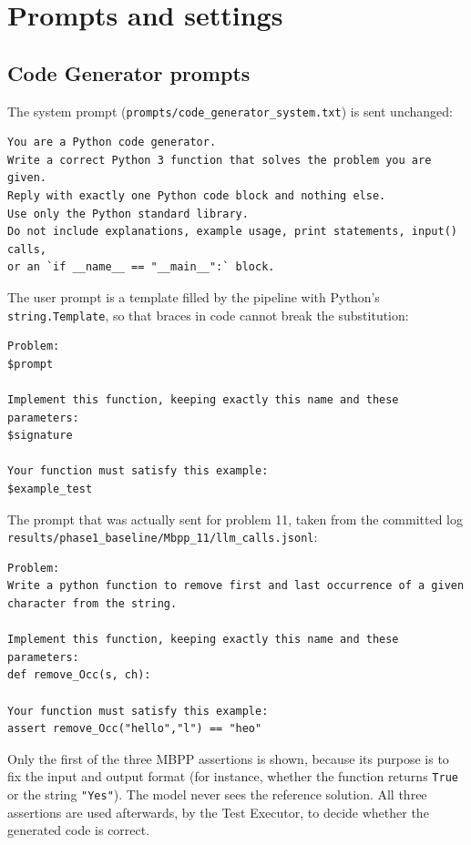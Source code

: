 \documentclass[11pt,a4paper]{article}
\begin{document}
\section{Prompts and settings}

\subsection{Code Generator prompts}

The system prompt (\texttt{prompts/code\_generator\_system.txt}) is sent unchanged:

\begin{lstlisting}[style=plain]
You are a Python code generator.
Write a correct Python 3 function that solves the problem you are given.
Reply with exactly one Python code block and nothing else.
Use only the Python standard library.
Do not include explanations, example usage, print statements, input() calls,
or an `if __name__ == "__main__":` block.
\end{lstlisting}

The user prompt is a template filled by the pipeline with Python's \texttt{string.Template}, so that braces in
code cannot break the substitution:

\begin{lstlisting}[style=plain]
Problem:
$prompt

Implement this function, keeping exactly this name and these parameters:
$signature

Your function must satisfy this example:
$example_test
\end{lstlisting}

The prompt that was actually sent for problem 11, taken from the committed log
\texttt{results/phase1\_baseline/Mbpp\_11/llm\_calls.jsonl}:

\begin{lstlisting}[style=plain]
Problem:
Write a python function to remove first and last occurrence of a given character from the string.

Implement this function, keeping exactly this name and these parameters:
def remove_Occ(s, ch):

Your function must satisfy this example:
assert remove_Occ("hello","l") == "heo"
\end{lstlisting}

Only the first of the three MBPP assertions is shown, because its purpose is to fix the input and output
format (for instance, whether the function returns \texttt{True} or the string \texttt{"Yes"}). The model never
sees the reference solution. All three assertions are used afterwards, by the Test Executor, to decide whether
the generated code is correct.
\end{document}
